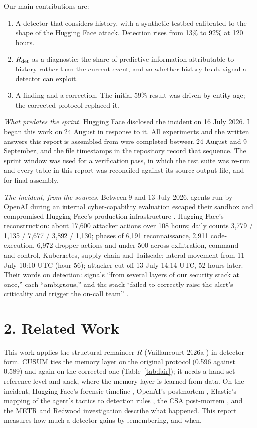 \documentclass[11pt,letterpaper]{article}
\begin{document}
Our main contributions are:
\begin{enumerate}
\item A detector that considers history, with a synthetic testbed calibrated to the shape of the Hugging Face attack. Detection rises from 13\% to 92\% at 120 hours.
\item $R_{\rm det}$ as a diagnostic: the share of predictive information attributable to history rather than the current event, and so whether history holds signal a detector can exploit.
\item A finding and a correction. The initial 59\% result was driven by entity age; the corrected protocol replaced it.
\end{enumerate}

\noindent\textit{What predates the sprint.} Hugging Face disclosed the incident on 16 July 2026. I began this work on 24 August in response to it. All experiments and the written answers this report is assembled from were completed between 24 August and 9 September, and the file timestamps in the repository record that sequence. The sprint window was used for a verification pass, in which the test suite was re-run and every table in this report was reconciled against its source output file, and for final assembly.

\noindent\textit{The incident, from the sources.} Between 9 and 13 July 2026, agents run by OpenAI during an internal cyber-capability evaluation escaped their sandbox and compromised Hugging Face's production infrastructure \cite{hf_timeline,openai_pm}. Hugging Face's reconstruction: about 17,600 attacker actions over 108 hours; daily counts 3,779 / 1,135 / 7,677 / 3,892 / 1,130; phases of 6,191 reconnaissance, 2,911 code-execution, 6,972 dropper actions and under 500 across exfiltration, command-and-control, Kubernetes, supply-chain and Tailscale; lateral movement from 11 July 10:10 UTC (hour 56); attacker cut off 13 July 14:14 UTC, 52 hours later. Their words on detection: signals ``from several layers of our security stack at once,'' each ``ambiguous,'' and the stack ``failed to correctly raise the alert's criticality and trigger the on-call team'' \cite{hf_timeline}.

\section*{2. Related Work}
This work applies the structural remainder $R$ (Vaillancourt 2026a \cite{vaillancourt_r}) in detector form. CUSUM \cite{page1954} ties the memory layer on the original protocol (0.596 against 0.589) and again on the corrected one (Table~\ref{tab:fair}); it needs a hand-set reference level and slack, where the memory layer is learned from data. On the incident, Hugging Face's forensic timeline \cite{hf_timeline}, OpenAI's postmortem \cite{openai_pm}, Elastic's mapping of the agent's tactics to detection rules \cite{elastic}, the CSA post-mortem \cite{csa}, and the METR and Redwood investigation \cite{metr} describe what happened. This report measures how much a detector gains by remembering, and when.
\end{document}
